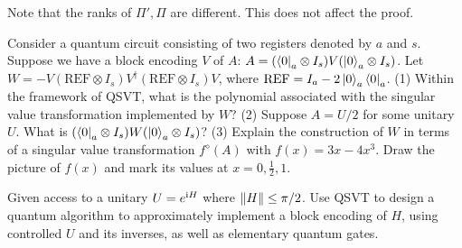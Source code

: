 Note that the ranks of $\Pi',\Pi$ are different. This does not affect the proof. 


\vspace{2em}

\begin{exer}
Consider a quantum circuit consisting of two registers denoted by $a$ and $s$. Suppose we have a block encoding $V$ of $A$: $A=(\bra{0}_a\otimes I_s)V(\ket{0}_a\otimes I_s)$. Let $W=-V(\mathrm{REF}\otimes I_s)V^{\dagger}(\mathrm{REF}\otimes I_s)V$, where $\mathrm{REF}=I_a-2\ket{0}_a\bra{0}_a$. (1) Within the framework of QSVT, what is the polynomial associated with the singular value transformation implemented by $W$? (2) Suppose $A=U/2$ for some unitary $U$. What is $(\bra{0}_a\otimes I_s)W(\ket{0}_a\otimes I_s)$? (3) Explain the construction of $W$ in terms of a singular value transformation $f^{\diamond}(A)$ with $f(x)=3x-4x^3$. Draw the picture of $f(x)$ and mark its values at $x=0,\frac12,1$.
\end{exer}

\begin{exer}
  Given access to a unitary $U=e^{\mathrm{i} H}$ where $\left\lVert H\right\rVert\le \pi/2$. Use QSVT to design a quantum algorithm to approximately implement a block encoding of $H$, using controlled $U$ and its inverses, as well as elementary quantum gates.
\end{exer}
